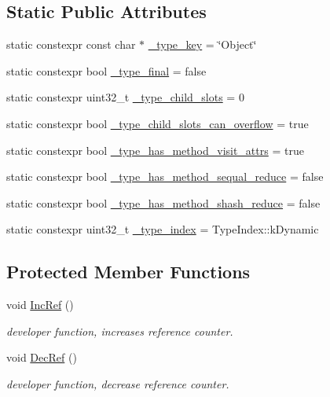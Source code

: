 \subsection*{Static Public Attributes}
\begin{DoxyCompactItemize}
\item 
static constexpr const char $\ast$ \hyperlink{classtvm_1_1runtime_1_1Object_a43d6bf3191bebb805eced0744d859c1e}{\+\_\+type\+\_\+key} = \char`\"{}Object\char`\"{}
\item 
static constexpr bool \hyperlink{classtvm_1_1runtime_1_1Object_a55cb618bd4bbcd49317b35ea8e2996be}{\+\_\+type\+\_\+final} = false
\item 
static constexpr uint32\+\_\+t \hyperlink{classtvm_1_1runtime_1_1Object_a14b234a745215da158b2386bbb34bd70}{\+\_\+type\+\_\+child\+\_\+slots} = 0
\item 
static constexpr bool \hyperlink{classtvm_1_1runtime_1_1Object_a05ece7bcb6bf73e88765c1f193a489ce}{\+\_\+type\+\_\+child\+\_\+slots\+\_\+can\+\_\+overflow} = true
\item 
static constexpr bool \hyperlink{classtvm_1_1runtime_1_1Object_a74e9f076b50b8b335b4a321e9b0bf03c}{\+\_\+type\+\_\+has\+\_\+method\+\_\+visit\+\_\+attrs} = true
\item 
static constexpr bool \hyperlink{classtvm_1_1runtime_1_1Object_a92fe62494027b70af1f7696d611c21b6}{\+\_\+type\+\_\+has\+\_\+method\+\_\+sequal\+\_\+reduce} = false
\item 
static constexpr bool \hyperlink{classtvm_1_1runtime_1_1Object_ac97054694d03dc5eac58315fb569ef88}{\+\_\+type\+\_\+has\+\_\+method\+\_\+shash\+\_\+reduce} = false
\item 
static constexpr uint32\+\_\+t \hyperlink{classtvm_1_1runtime_1_1Object_af6aed95d70af7e44ce376a8d7be6c5f1}{\+\_\+type\+\_\+index} = Type\+Index\+::k\+Dynamic
\end{DoxyCompactItemize}
\subsection*{Protected Member Functions}
\begin{DoxyCompactItemize}
\item 
void \hyperlink{classtvm_1_1runtime_1_1Object_ac9e5eed7719e322117bde996a171e33a}{Inc\+Ref} ()
\begin{DoxyCompactList}\small\item\em developer function, increases reference counter. \end{DoxyCompactList}\item 
void \hyperlink{classtvm_1_1runtime_1_1Object_a70fb5361147634605d6595bb89381f03}{Dec\+Ref} ()
\begin{DoxyCompactList}\small\item\em developer function, decrease reference counter. \end{DoxyCompactList}\end{DoxyCompactItemize}
